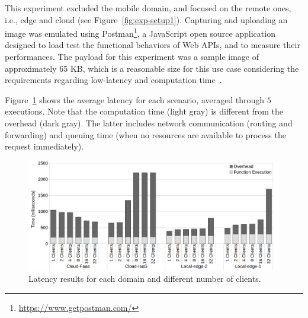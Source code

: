This experiment excluded the mobile domain, and focused on the remote ones, i.e., edge and cloud (see Figure~\ref{fig:exp-setup1}). Capturing and uploading an image was emulated using Postman\footnote{\url{https://www.getpostman.com/}}, a JavaScript open source application designed to load test the functional behaviors of Web APIs, and to measure their performances. The payload for this experiment was a sample image of approximately 65 KB, which is a reasonable size for this use case considering the requirements regarding low-latency and computation time~\cite{rodriguez16mobile}. 





 






 Figure~\ref{fig:latency-domains} shows the average latency for each scenario, averaged through $5$ executions. Note that the computation time (light gray) is different from the overhead (dark gray). The latter includes network communication (routing and forwarding) and queuing time (when no resources are available to process the request immediately). 

\begin{figure}
	
	\centering
	\includegraphics[width=1\textwidth]{figs/latency-domains}
	\caption{Latency results for each domain and different number of clients.}
	\label{fig:latency-domains}
\end{figure}

